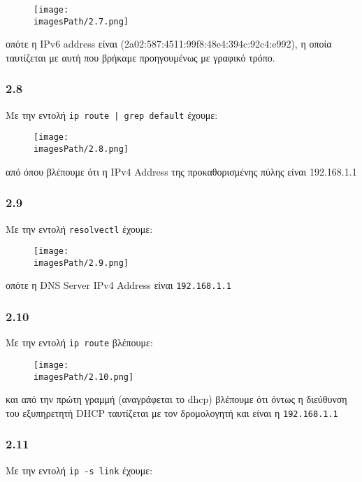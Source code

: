 			\begin{figure}[H]
				\texttt{[image: \\imagesPath/2.7.png]}
			\end{figure}
		
			οπότε η IPv6 address είναι (2a02:587:4511:99f8:48e4:394c:92c4:e992), η οποία ταυτίζεται με αυτή που βρήκαμε προηγουμένως με γραφικό τρόπο.
			
		\subsubsection*{2.8}
			Με την εντολή \verb+ip route | grep default+ έχουμε: 
		
			\begin{figure}[H]
				\texttt{[image: \\imagesPath/2.8.png]}
			\end{figure}
		
			από όπου βλέπουμε ότι η IPv4 Address της προκαθορισμένης πύλης είναι 192.168.1.1
		
		\subsubsection*{2.9}
			Με την εντολή \verb|resolvectl| έχουμε:
			
			\begin{figure}[H]
				\texttt{[image: \\imagesPath/2.9.png]}
			\end{figure}
		
			οπότε η DNS Server IPv4 Address είναι \verb|192.168.1.1|
			
		\subsubsection*{2.10}
			Με την εντολή \verb|ip route| βλέπουμε:
			
			\begin{figure}[H]
				\texttt{[image: \\imagesPath/2.10.png]}
			\end{figure}
		
			και από την πρώτη γραμμή (αναγράφεται το dhcp) βλέπουμε ότι όντως η διεύθυνση του εξυπηρετητή DHCP ταυτίζεται με τον δρομολογητή και είναι η \verb|192.168.1.1|
			
		\subsubsection*{2.11}
		
			Με την εντολή \verb|ip -s link| έχουμε:
			

